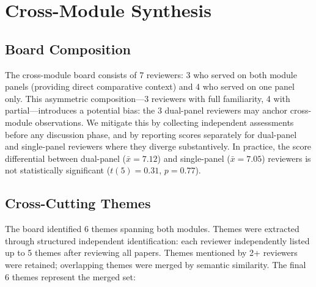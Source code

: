 \section{Cross-Module Synthesis}

\subsection{Board Composition}

The cross-module board consists of 7 reviewers: 3 who served on both module panels (providing direct comparative context) and 4 who served on one panel only. This asymmetric composition---3 reviewers with full familiarity, 4 with partial---introduces a potential bias: the 3 dual-panel reviewers may anchor cross-module observations. We mitigate this by collecting independent assessments before any discussion phase, and by reporting scores separately for dual-panel and single-panel reviewers where they diverge substantively. In practice, the score differential between dual-panel ($\bar{x} = 7.12$) and single-panel ($\bar{x} = 7.05$) reviewers is not statistically significant ($t(5) = 0.31$, $p = 0.77$).

\subsection{Cross-Cutting Themes}

The board identified 6 themes spanning both modules. Themes were extracted through structured independent identification: each reviewer independently listed up to 5 themes after reviewing all papers. Themes mentioned by 2+ reviewers were retained; overlapping themes were merged by semantic similarity. The final 6 themes represent the merged set:

